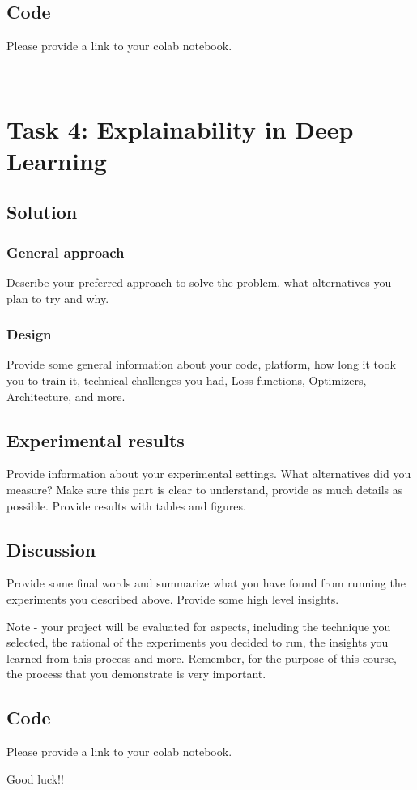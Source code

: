 \documentclass{article}
\begin{document}
\subsection{Code}

Please provide a link to your colab notebook.


\
\section{Task 4: Explainability in Deep Learning}

\subsection{Solution}
\subsubsection{General approach}
Describe your preferred approach to solve the problem. what alternatives you plan to try and why. 

\subsubsection{Design}
Provide some general information about your code, platform, how long it took you to train it, technical challenges you had, Loss functions, Optimizers, Architecture, and more.

\subsection{Experimental results}
Provide information about your experimental settings. What alternatives did you measure? Make sure this part is clear to understand, provide as much details as possible. Provide results with tables and figures.

\subsection{Discussion}
Provide some final words and summarize what you have found from running the experiments you described above. Provide some high level insights.

Note - your project will be evaluated for aspects, including the technique you selected, the rational of the experiments you decided to run, the insights you learned from this process and more. Remember, for the purpose of this course, the process that you demonstrate is very  important.

\subsection{Code}

Please provide a link to your colab notebook.

Good luck!!


\end{document}
